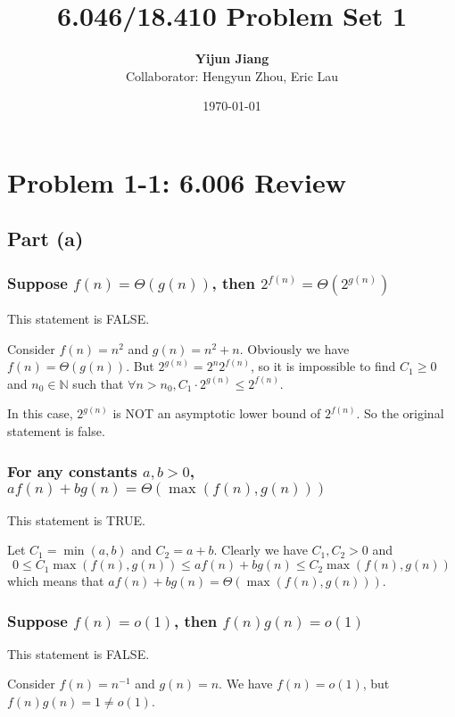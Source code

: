 \documentclass{article}
\title{6.046/18.410 Problem Set 1}
\author{\textbf{Yijun Jiang}\\Collaborator: Hengyun Zhou, Eric Lau}
\date{\today}
\begin{document}
\maketitle
\section{Problem 1-1: 6.006 Review}
\subsection{Part (a)}
\subsubsection{Suppose $f(n)=\Theta(g(n))$, then $2^{f(n)}=\Theta(2^{g(n)})$}
This statement is FALSE.

Consider $f(n)=n^2$ and $g(n)=n^2+n$. Obviously we have $f(n)=\Theta(g(n))$. But $2^{g(n)}=2^n2^{f(n)}$, so it is impossible to find $C_1\geqslant0$ and $n_0\in\mathbb{N}$ such that $\forall n>n_0, C_1\cdot2^{g(n)}\leqslant 2^{f(n)}$.

In this case, $2^{g(n)}$ is NOT an asymptotic lower bound of $2^{f(n)}$. So the original statement is false.

\subsubsection{For any constants $a,b>0$, $af(n)+bg(n)=\Theta(\max{(f(n),g(n))})$}
This statement is TRUE.

Let $C_1=\min{(a,b)}$ and $C_2=a+b$. Clearly we have $C_1,C_2>0$ and
\begin{equation*}
0\leqslant C_1\max{(f(n),g(n))}\leqslant af(n)+bg(n)\leqslant C_2\max{(f(n),g(n))}
\end{equation*}
which means that $af(n)+bg(n)=\Theta(\max{(f(n),g(n))})$.

\subsubsection{Suppose $f(n)=o(1)$, then $f(n)g(n)=o(1)$}
This statement is FALSE.

Consider $f(n)=n^{-1}$ and $g(n)=n$. We have $f(n)=o(1)$, but $f(n)g(n)=1\neq o(1)$.
\end{document}
